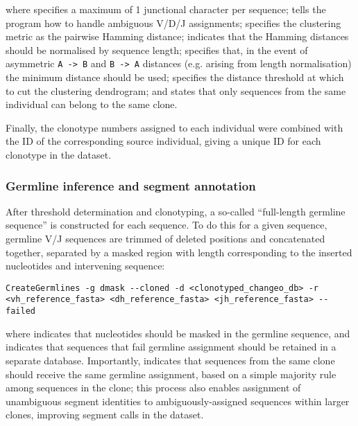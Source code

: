 \noindent where  specifies a maximum of 1 junctional  character per sequence;  tells the program how to handle ambiguous V/D/J assignments;  specifies the clustering metric as the pairwise Hamming distance;  indicates that the Hamming distances should be normalised by sequence length;  specifies that, in the event of asymmetric \texttt{A -> B} and \texttt{B -> A} distances (e.g. arising from length normalisation) the minimum distance should be used;  specifies the distance threshold at which to cut the clustering dendrogram; and  states that only sequences from the same individual can belong to the same clone.

Finally, the clonotype numbers assigned to each individual were combined with the ID of the corresponding source individual, giving a unique ID for each clonotype in the dataset.

\subsubsection{Germline inference and segment annotation}
\label{sec:methods_comp_igpreproc_germ}

After threshold determination and clonotyping, a so-called ``full-length germline sequence'' is constructed for each sequence. To do this for a given sequence, germline V/J sequences are trimmed of deleted positions and concatenated together, separated by a masked region with length corresponding to the inserted nucleotides and intervening \dh sequence:

\begin{lstlisting}
CreateGermlines -g dmask --cloned -d <clonotyped_changeo_db> -r <vh_reference_fasta> <dh_reference_fasta> <jh_reference_fasta> --failed
\end{lstlisting}

\noindent where  indicates that \dh nucleotides should be masked in the germline sequence, and  indicates that sequences that fail germline assignment should be retained in a separate database. Importantly,  indicates that sequences from the same clone should receive the same germline assignment, based on a simple majority rule among sequences in the clone; this process also enables assignment of unambiguous segment identities to ambiguously-assigned sequences within larger clones, improving segment calls in the dataset. 

